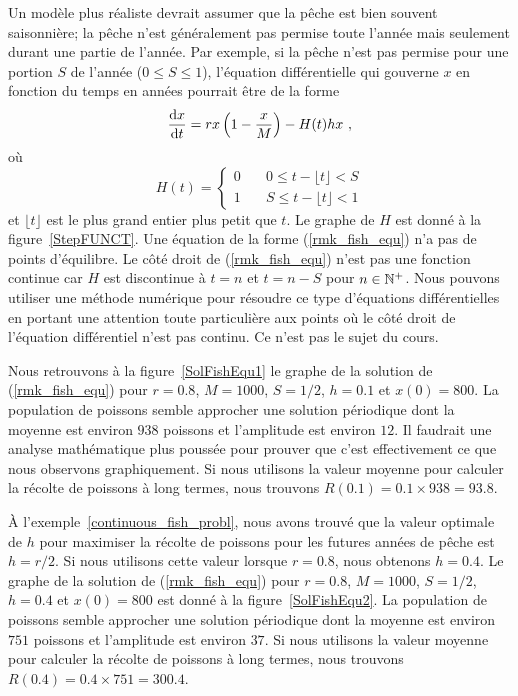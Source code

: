 {\begin{rmk}[\life]
Un modèle plus réaliste devrait assumer que la pêche est
bien souvent saisonnière; la pêche n'est généralement pas permise
toute l'année mais seulement durant une partie de l'année.  Par
exemple, si la pêche n'est pas permise pour une portion $S$ de
l'année ($0\leq S \leq 1$), l'équation différentielle qui gouverne $x$
en fonction du temps en années pourrait être de la forme
\begin{equation} \label{rmk_fish_equ} 
\frac{\mathrm{d}x}{\mathrm{d}t} = r x\left(1-\frac{x}{M}\right) - H(t) h x \ ,
\end{equation}
où
\begin{equation} \label{rmk_fish_H}
H(t) =
\begin{cases}
0 & \quad 0 \leq t - \lfloor t \rfloor < S\\
1 & \quad S \leq t - \lfloor t \rfloor <1
\end{cases}
\end{equation}
et $\lfloor t \rfloor$ est le plus grand entier plus petit que $t$.
Le graphe de $H$ est donné à la figure~\ref{StepFUNCT}.  Une équation
de la forme (\ref{rmk_fish_equ}) n'a pas de points d'équilibre.  Le côté
droit de (\ref{rmk_fish_equ}) n'est pas une fonction continue car $H$
est discontinue à $t=n$ et $t=n - S$ pour $n \in \mathbb{N}^+$.  Nous pouvons
utiliser une méthode numérique pour résoudre ce type d'équations
différentielles en portant une attention toute particulière aux points
où le côté droit de l'équation différentiel n'est pas continu.  Ce
n'est pas le sujet du cours.

Nous retrouvons à la figure~\ref{SolFishEqu1} le graphe de la solution de
(\ref{rmk_fish_equ}) pour $r = 0.8$, $M=1000$, $S=1/2$, $h=0.1$ et
$x(0)=800$.  La population de poissons semble approcher une solution
périodique dont la moyenne est environ $938$ poissons et l'amplitude
est environ $12$.  Il faudrait une analyse mathématique plus poussée
pour prouver que c'est effectivement ce que nous observons
graphiquement.  Si nous utilisons la valeur moyenne pour calculer la
récolte de poissons à long termes, nous trouvons
$R(0.1) = 0.1 \times 938 = 93.8$.

À l'exemple~\ref{continuous_fish_probl}, nous avons trouvé que la valeur
optimale de $h$ pour maximiser la récolte de poissons pour les futures
années de pêche est $h=r/2$.  Si nous utilisons cette valeur lorsque
$r=0.8$, nous obtenons $h=0.4$.  Le graphe de la solution de
(\ref{rmk_fish_equ}) pour $r = 0.8$, $M=1000$, $S=1/2$, $h=0.4$ et
$x(0)=800$ est donné à la figure~\ref{SolFishEqu2}.  La population de
poissons semble approcher une solution
périodique dont la moyenne est environ $751$ poissons et l'amplitude
est environ $37$.    Si nous utilisons la valeur moyenne pour calculer la
récolte de poissons à long termes, nous trouvons
$R(0.4) = 0.4 \times 751 = 300.4$. 


\end{rmk}}
